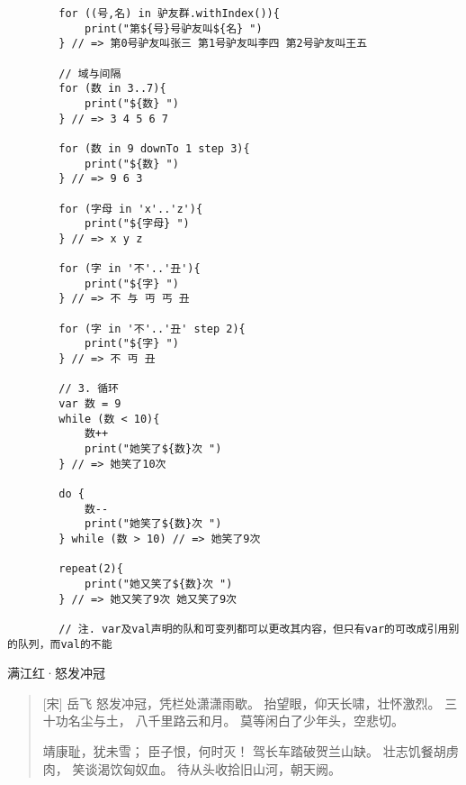 \begin{verbatim}
        for ((号,名) in 驴友群.withIndex()){
            print("第${号}号驴友叫${名} ")
        } // => 第0号驴友叫张三 第1号驴友叫李四 第2号驴友叫王五 

        // 域与间隔
        for (数 in 3..7){
            print("${数} ")
        } // => 3 4 5 6 7 

        for (数 in 9 downTo 1 step 3){
            print("${数} ")
        } // => 9 6 3
        
        for (字母 in 'x'..'z'){
            print("${字母} ")
        } // => x y z 
        
        for (字 in '不'..'丑'){
            print("${字} ")
        } // => 不 与 丏 丐 丑       

        for (字 in '不'..'丑' step 2){
            print("${字} ")
        } // => 不 丏 丑 
        
        // 3. 循环
        var 数 = 9
        while (数 < 10){
            数++
            print("她笑了${数}次 ")
        } // => 她笑了10次
        
        do {
            数--
            print("她笑了${数}次 ")
        } while (数 > 10) // => 她笑了9次
        
        repeat(2){
            print("她又笑了${数}次 ")
        } // => 她又笑了9次 她又笑了9次
          
        // 注. var及val声明的队和可变列都可以更改其内容，但只有var的可改成引用别的队列，而val的不能
    \end{verbatim}





满江红·怒发冲冠\citep{岳飞:满江红}
\begin{verse}
    [宋] 岳飞
    怒发冲冠，凭栏处潇潇雨歇。
    抬望眼，仰天长啸，壮怀激烈。
    三十功名尘与土，
    八千里路云和月。
    莫等闲白了少年头，空悲切。

    靖康耻，犹未雪；
    臣子恨，何时灭！
    驾长车踏破贺兰山缺。
    壮志饥餐胡虏肉，
    笑谈渴饮匈奴血。
    待从头收拾旧山河，朝天阙。    
\end{verse}




